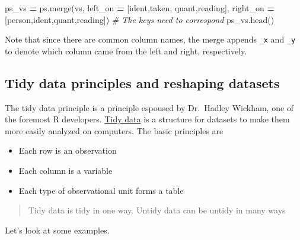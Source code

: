 \documentclass[
  letterpaper,
]{scrbook}
\newenvironment{Shaded}{\begin{snugshade}}{\end{snugshade}}
\newcommand{\CommentTok}[1]{\textcolor[rgb]{0.56,0.35,0.01}{\textit{#1}}}
\newcommand{\NormalTok}[1]{#1}
\newcommand{\OperatorTok}[1]{\textcolor[rgb]{0.81,0.36,0.00}{\textbf{#1}}}
\newcommand{\StringTok}[1]{\textcolor[rgb]{0.31,0.60,0.02}{#1}}
\providecommand{\tightlist}{%
  \setlength{\itemsep}{0pt}\setlength{\parskip}{0pt}}
\begin{document}
\begin{Shaded}
\begin{Highlighting}[]
\NormalTok{ps\_vs }\OperatorTok{=}\NormalTok{ ps.merge(vs, }
\NormalTok{                left\_on }\OperatorTok{=}\NormalTok{ [}\StringTok{\textquotesingle{}ident\textquotesingle{}}\NormalTok{,}\StringTok{\textquotesingle{}taken\textquotesingle{}}\NormalTok{, }\StringTok{\textquotesingle{}quant\textquotesingle{}}\NormalTok{,}\StringTok{\textquotesingle{}reading\textquotesingle{}}\NormalTok{],}
\NormalTok{                right\_on }\OperatorTok{=}\NormalTok{ [}\StringTok{\textquotesingle{}person\textquotesingle{}}\NormalTok{,}\StringTok{\textquotesingle{}ident\textquotesingle{}}\NormalTok{,}\StringTok{\textquotesingle{}quant\textquotesingle{}}\NormalTok{,}\StringTok{\textquotesingle{}reading\textquotesingle{}}\NormalTok{]) }\CommentTok{\# The keys need to correspond}
\NormalTok{ps\_vs.head()}
\end{Highlighting}
\end{Shaded}

Note that since there are common column names, the merge appends \texttt{\_x} and \texttt{\_y} to denote which column came from the left and right, respectively.

\hypertarget{tidy-data-principles-and-reshaping-datasets}{%
\subsection{Tidy data principles and reshaping datasets}\label{tidy-data-principles-and-reshaping-datasets}}

The tidy data principle is a principle espoused by Dr.~Hadley Wickham, one of the foremost R developers. \href{http://vita.had.co.nz/papers/tidy-data.pdf}{Tidy data} is a structure for datasets to make them more easily analyzed on computers. The basic principles are

\begin{itemize}
\tightlist
\item
  Each row is an observation
\item
  Each column is a variable
\item
  Each type of observational unit forms a table
\end{itemize}

\begin{quote}
Tidy data is tidy in one way. Untidy data can be untidy in many ways
\end{quote}

Let's look at some examples.
\end{document}
